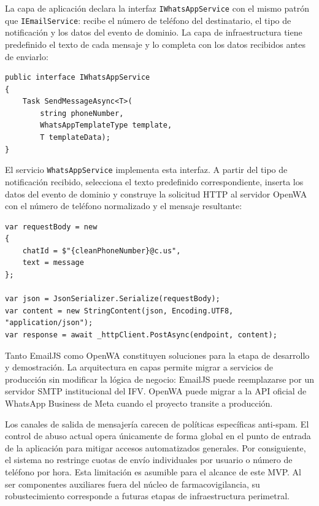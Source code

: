 La capa de aplicación declara la interfaz \texttt{IWhatsAppService} con el mismo patrón que \texttt{IEmailService}: recibe el número de teléfono del destinatario, el tipo de notificación y los datos del evento de dominio. 
La capa de infraestructura tiene predefinido el texto de cada mensaje y lo completa con los datos recibidos antes de enviarlo:

\begin{lstlisting}[language={[Sharp]C}, caption={Interfaz de envío de mensajes WhatsApp}, label={lst:iwhatsappservice}]
public interface IWhatsAppService
{
    Task SendMessageAsync<T>(
        string phoneNumber,
        WhatsAppTemplateType template,
        T templateData);
}
\end{lstlisting}

El servicio \texttt{WhatsAppService} implementa esta interfaz. A partir del tipo de notificación recibido, selecciona el texto predefinido correspondiente, inserta los datos del evento de dominio y construye la solicitud HTTP al servidor OpenWA con el número de teléfono normalizado y el mensaje resultante:

\begin{lstlisting}[language={[Sharp]C}, caption={Construcción y envío de la solicitud HTTP a OpenWA}, label={lst:whatsapp}]
var requestBody = new
{
    chatId = $"{cleanPhoneNumber}@c.us",
    text = message
};

var json = JsonSerializer.Serialize(requestBody);
var content = new StringContent(json, Encoding.UTF8, "application/json");
var response = await _httpClient.PostAsync(endpoint, content);
\end{lstlisting}

Tanto EmailJS como OpenWA constituyen soluciones para la etapa de desarrollo y demostración. 
La arquitectura en capas permite migrar a servicios de producción sin modificar la lógica de negocio: EmailJS puede reemplazarse por un servidor SMTP institucional del IFV.
OpenWA puede migrar a la API oficial de WhatsApp Business de Meta cuando el proyecto transite a producción. 

Los canales de salida de mensajería carecen de políticas específicas anti-spam.
El control de abuso actual opera únicamente de forma global en el punto de entrada de la aplicación para mitigar accesos automatizados generales.
Por consiguiente, el sistema no restringe cuotas de envío individuales por usuario o número de teléfono por hora. 
Esta limitación es asumible para el alcance de este MVP. 
Al ser componentes auxiliares fuera del núcleo de farmacovigilancia, su robustecimiento corresponde a futuras etapas de infraestructura perimetral.

